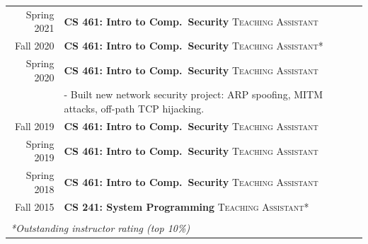 \documentclass[10pt,singlecolumn]{article} %
\begin{document}
\begin{tabular}{rl}
Spring 2021    & \textbf{CS 461: Intro to Comp.\ Security} \textsc{Teaching Assistant}\\ 
Fall 2020    & \textbf{CS 461: Intro to Comp.\ Security} \textsc{Teaching Assistant*}\\ 
Spring 2020	 & \textbf{CS 461: Intro to Comp.\ Security} \textsc{Teaching Assistant}\\ 
& - Built new network security project: ARP spoofing, MITM attacks, off-path TCP hijacking. \\

Fall 2019	 & \textbf{CS 461: Intro to Comp.\ Security} \textsc{Teaching Assistant}\\
Spring 2019	 & \textbf{CS 461: Intro to Comp.\ Security} \textsc{Teaching Assistant}\\  
Spring 2018	 & \textbf{CS 461: Intro to Comp.\ Security} \textsc{Teaching Assistant}\\ 
Fall 2015	 & \textbf{CS 241: System Programming} \textsc{Teaching Assistant*}\\ \\
\multicolumn{2}{l}{\emph{*Outstanding instructor rating (top 10\%)}}
\end{tabular}\\

\newpage

\end{document}
